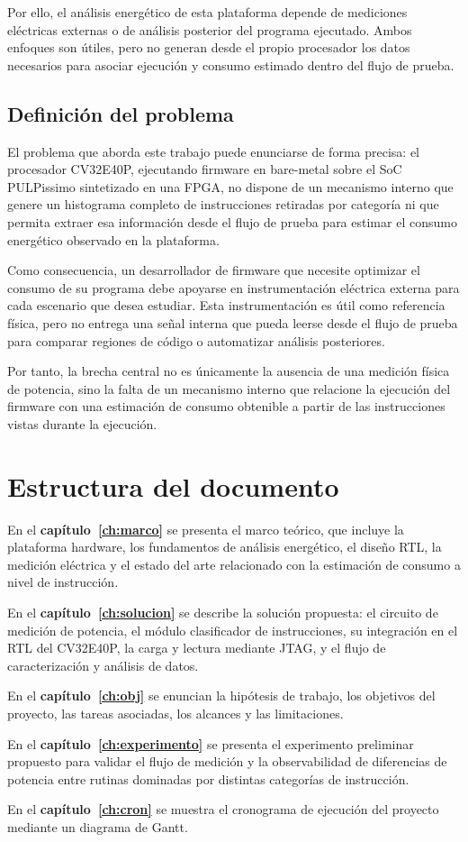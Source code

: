 Por ello, el análisis energético de esta plataforma depende de mediciones
eléctricas externas o de análisis posterior del programa ejecutado. Ambos
enfoques son útiles, pero no generan desde el propio procesador los datos
necesarios para asociar ejecución y consumo estimado dentro del flujo de
prueba.

\subsection{Definición del problema}
\label{sec:definicion}

El problema que aborda este trabajo puede enunciarse de forma precisa: el
procesador CV32E40P, ejecutando firmware en bare-metal sobre el SoC PULPissimo
sintetizado en una FPGA, no dispone de un mecanismo interno que genere un
histograma completo de instrucciones retiradas por categoría ni que permita
extraer esa información desde el flujo de prueba para estimar el consumo
energético observado en la plataforma.

Como consecuencia, un desarrollador de firmware que necesite optimizar el
consumo de su programa debe apoyarse en instrumentación eléctrica externa para
cada escenario que desea estudiar. Esta instrumentación es útil como referencia
física, pero no entrega una señal interna que pueda leerse desde el flujo de
prueba para comparar regiones de código o automatizar análisis posteriores.

Por tanto, la brecha central no es únicamente la ausencia de una medición física
de potencia, sino la falta de un mecanismo interno que relacione la ejecución
del firmware con una estimación de consumo obtenible a partir de las
instrucciones vistas durante la ejecución.

\section{Estructura del documento}
\label{sec:estructura}

En el \textbf{capítulo~\ref{ch:marco}} se presenta el marco teórico, que incluye
la plataforma hardware, los fundamentos de análisis energético, el diseño RTL,
la medición eléctrica y el estado del arte relacionado con la estimación de
consumo a nivel de instrucción.

En el \textbf{capítulo~\ref{ch:solucion}} se describe la solución propuesta:
el circuito de medición de potencia, el módulo clasificador de instrucciones,
su integración en el RTL del CV32E40P, la carga y lectura mediante JTAG, y el
flujo de caracterización y análisis de datos.

En el \textbf{capítulo~\ref{ch:obj}} se enuncian la hipótesis de trabajo, los
objetivos del proyecto, las tareas asociadas, los alcances y las limitaciones.

En el \textbf{capítulo~\ref{ch:experimento}} se presenta el experimento
preliminar propuesto para validar el flujo de medición y la observabilidad de
diferencias de potencia entre rutinas dominadas por distintas categorías de
instrucción.

En el \textbf{capítulo~\ref{ch:cron}} se muestra el cronograma de ejecución
del proyecto mediante un diagrama de Gantt.
